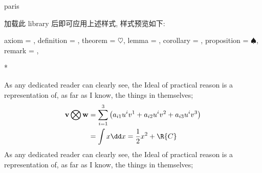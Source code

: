 \begin{function}[updated=2024-12-05]{paris}
  \begin{syntax}
  \end{syntax}
  加载此 library 后即可应用上述样式, 样式预览如下: 
\end{function}
\begingroup
{}
\zthmiconset
  {
    axiom       = ,
    definition  = , 
    theorem     = \(\heartsuit\), 
    lemma       = ,
    corollary   = , 
    proposition = \(\spadesuit\), 
    remark      = ,
  }
\begin{DocExample}*
\begin{axiom}
As any dedicated reader can clearly see, the Ideal of practical
reason is a representation of, as far as I know, the things in themselves; 
\begin{align}
\underset{}{\mathbf{v} \bigotimes \mathbf{w}} 
    & = \sum_{i=1}^3\left(a_{i1}u^iv^1+a_{i2}u^iv^2+a_{i3}u^iv^3\right) \\
    & = \int x \dd x = \frac12 x^2 + \R{C} 
  \end{align}  
As any dedicated reader can clearly see, the Ideal of practical
reason is a representation of, as far as I know, the things in themselves;%
\end{axiom}
\end{DocExample}
\endgroup



